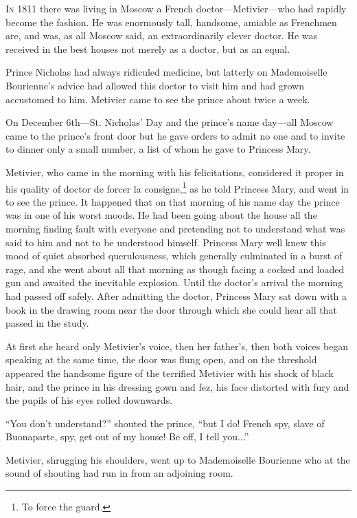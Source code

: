 \lettrine[lines=2, loversize=0.3, lraise=0]{\initfamily I}{n}
1811 there was living in Moscow a French
doctor---Metivier---who had rapidly become the fashion. He was
enormously tall, handsome, amiable as Frenchmen are, and was, as
all Moscow said, an extraordinarily clever doctor. He was
received in the best houses not merely as a doctor, but as an
equal.

Prince Nicholas had always ridiculed medicine, but latterly on
Mademoiselle Bourienne's advice had allowed this doctor to visit
him and had grown accustomed to him. Metivier came to see the
prince about twice a week.

On December 6th---St. Nicholas' Day and the prince's name
day---all Moscow came to the prince's front door but he gave
orders to admit no one and to invite to dinner only a small
number, a list of whom he gave to Princess Mary.

Metivier, who came in the morning with his felicitations,
considered it proper in his quality of doctor de forcer la
consigne,\footnote{To force the guard.} as he told Princess Mary,
and went in to see the prince. It happened that on that morning
of his name day the prince was in one of his worst moods. He had
been going about the house all the morning finding fault with
everyone and pretending not to understand what was said to him
and not to be understood himself. Princess Mary well knew this
mood of quiet absorbed querulousness, which generally culminated
in a burst of rage, and she went about all that morning as though
facing a cocked and loaded gun and awaited the inevitable
explosion. Until the doctor's arrival the morning had passed off
safely. After admitting the doctor, Princess Mary sat down with a
book in the drawing room near the door through which she could
hear all that passed in the study.

At first she heard only Metivier's voice, then her father's, then
both voices began speaking at the same time, the door was flung
open, and on the threshold appeared the handsome figure of the
terrified Metivier with his shock of black hair, and the prince
in his dressing gown and fez, his face distorted with fury and
the pupils of his eyes rolled downwards.

``You don't understand?'' shouted the prince, ``but I do! French
spy, slave of Buonaparte, spy, get out of my house! Be off, I
tell you...''

Metivier, shrugging his shoulders, went up to Mademoiselle
Bourienne who at the sound of shouting had run in from an
adjoining room.

